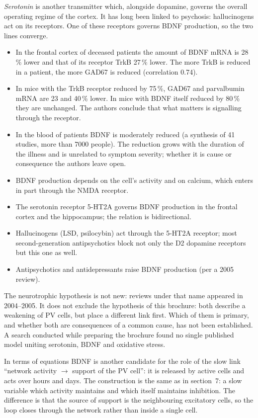 \emph{Serotonin} is another transmitter which, alongside dopamine, governs the overall operating regime of the cortex. It has long been linked to psychosis: hallucinogens act on its receptors. One of these receptors governs BDNF production, so the two lines converge.
\facts
\begin{itemize}
\item In the frontal cortex of deceased patients the amount of BDNF mRNA is 28\,\% lower and that of its receptor TrkB 27\,\% lower. The more TrkB is reduced in a patient, the more GAD67 is reduced (correlation 0.74).\tP
\item In mice with the TrkB receptor reduced by 75\,\%, GAD67 and parvalbumin mRNA are 23 and 40\,\% lower. In mice with BDNF itself reduced by 80\,\% they are unchanged. The authors conclude that what matters is signalling through the receptor.\tP
\item In the blood of patients BDNF is moderately reduced (a synthesis of 41 studies, more than 7000 people). The reduction grows with the duration of the illness and is unrelated to symptom severity; whether it is cause or consequence the authors leave open.\tP
\item BDNF production depends on the cell's activity and on calcium, which enters in part through the NMDA receptor.\tU
\item The serotonin receptor 5-HT2A governs BDNF production in the frontal cortex and the hippocampus; the relation is bidirectional.\tP
\item Hallucinogens (LSD, psilocybin) act through the 5-HT2A receptor; most second-generation antipsychotics block not only the D2 dopamine receptors but this one as well.\tU
\item Antipsychotics and antidepressants raise BDNF production (per a 2005 review).\tP
\end{itemize}
\begin{note}
The neurotrophic hypothesis is not new: reviews under that name appeared in 2004--2005. It does not exclude the hypothesis of this brochure: both describe a weakening of PV cells, but place a different link first. Which of them is primary, and whether both are consequences of a common cause, has not been established. A search conducted while preparing the brochure found no single published model uniting serotonin, BDNF and oxidative stress.
\end{note}
\begin{ineq}
In terms of equations BDNF is another candidate for the role of the slow link ``network activity $\to$ support of the PV cell'': it is released by active cells and acts over hours and days. The construction is the same as in section~7: a slow variable which activity maintains and which itself maintains inhibition. The difference is that the source of support is the neighbouring excitatory cells, so the loop closes through the network rather than inside a single cell.\tD
\end{ineq}
